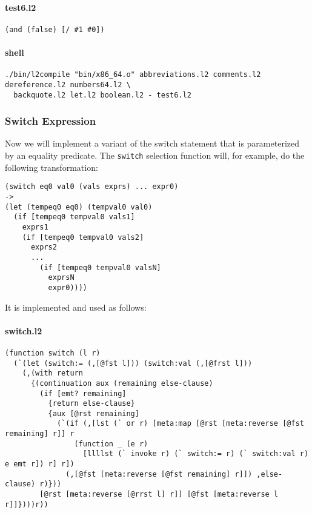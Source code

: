 \documentclass[]{article}
\let\oldparagraph\paragraph
\renewcommand{\paragraph}[1]{\oldparagraph{#1}\mbox{}}
\begin{document}
\paragraph{test6.l2}\label{test6.l2}

\begin{verbatim}
(and (false) [/ #1 #0])
\end{verbatim}

\paragraph{shell}\label{shell-5}

\begin{verbatim}
./bin/l2compile "bin/x86_64.o" abbreviations.l2 comments.l2 dereference.l2 numbers64.l2 \
  backquote.l2 let.l2 boolean.l2 - test6.l2
\end{verbatim}

\hypertarget{switch-expression}{\subsubsection{Switch
Expression}\label{switch-expression}}

Now we will implement a variant of the switch statement that is
parameterized by an equality predicate. The \texttt{switch} selection
function will, for example, do the following transformation:

\begin{verbatim}
(switch eq0 val0 (vals exprs) ... expr0)
->
(let (tempeq0 eq0) (tempval0 val0)
  (if [tempeq0 tempval0 vals1]
    exprs1
    (if [tempeq0 tempval0 vals2]
      exprs2
      ...
        (if [tempeq0 tempval0 valsN]
          exprsN
          expr0))))
\end{verbatim}

It is implemented and used as follows:

\paragraph{switch.l2}\label{switch.l2}

\begin{verbatim}
(function switch (l r)
  (`(let (switch:= (,[@fst l])) (switch:val (,[@frst l]))
    (,(with return
      {(continuation aux (remaining else-clause)
        (if [emt? remaining]
          {return else-clause}
          {aux [@rst remaining]
            (`(if (,[lst (` or r) [meta:map [@rst [meta:reverse [@fst remaining] r]] r
                (function _ (e r)
                  [llllst (` invoke r) (` switch:= r) (` switch:val r) e emt r]) r] r])
              (,[@fst [meta:reverse [@fst remaining] r]]) ,else-clause) r)}))
        [@rst [meta:reverse [@rrst l] r]] [@fst [meta:reverse l r]]})))r))
\end{verbatim}
\end{document}
